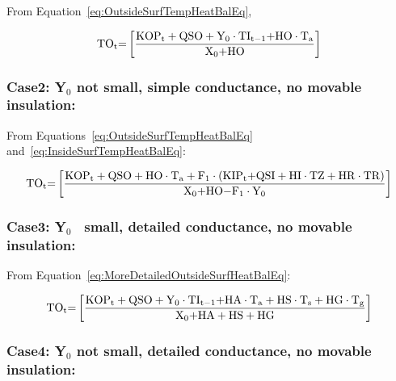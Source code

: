 From Equation~\ref{eq:OutsideSurfTempHeatBalEq},

\begin{equation}
{\rm{T}}{{\rm{O}}_{\rm{t}}}{\rm{ = }}\left[ {\frac{{{\rm{KO}}{{\rm{P}}_{\rm{t}}} + {\rm{QSO}} + {{\rm{Y}}_0}\cdot {\rm{T}}{{\rm{I}}_{{\rm{t - 1}}}}{\rm{ + HO}}\cdot {{\rm{T}}_{\rm{a}}}}}{{{{\rm{X}}_{\rm{0}}}{\rm{ + HO}}}}} \right]{\rm{  }}
\end{equation}

\subsubsection{Case2: Y\(_{0}\) not small, simple conductance, no movable insulation:}\label{case2-yux5f0-not-small-simple-conductance-no-movable-insulation}

From Equations~\ref{eq:OutsideSurfTempHeatBalEq} and~\ref{eq:InsideSurfTempHeatBalEq}:

\begin{equation}
{\rm{T}}{{\rm{O}}_{\rm{t}}}{\rm{ = }}\left[ {\frac{{{\rm{KO}}{{\rm{P}}_{\rm{t}}} + {\rm{QSO}} + {\rm{HO}}\cdot {{\rm{T}}_{\rm{a}}} + {{\rm{F}}_1}\cdot \left( {{\rm{KI}}{{\rm{P}}_{\rm{t}}}{\rm{ + QSI + HI}}\cdot {\rm{TZ + HR}}\cdot {\rm{TR}}} \right)}}{{{{\rm{X}}_{\rm{0}}}{\rm{ + HO - }}{{\rm{F}}_{\rm{1}}}\cdot {{\rm{Y}}_0}}}} \right]{\rm{  }}
\end{equation}

\subsubsection{Case3: Y\(_{0}\)~ small, detailed conductance, no movable insulation:}\label{case3-yux5f0-small-detailed-conductance-no-movable-insulation}

From Equation~\ref{eq:MoreDetailedOutsideSurfHeatBalEq}:

\begin{equation}
{\rm{T}}{{\rm{O}}_{\rm{t}}}{\rm{ = }}\left[ {\frac{{{\rm{KO}}{{\rm{P}}_{\rm{t}}} + {\rm{QSO}} + {{\rm{Y}}_0}\cdot {\rm{T}}{{\rm{I}}_{{\rm{t - 1}}}}{\rm{ + HA}}\cdot {{\rm{T}}_{\rm{a}}} + {\rm{HS}}\cdot {{\rm{T}}_{\rm{s}}} + {\rm{HG}}\cdot {{\rm{T}}_{\rm{g}}}}}{{{{\rm{X}}_{\rm{0}}}{\rm{ + HA + HS + HG}}}}} \right]{\rm{  }}
\end{equation}

\subsubsection{Case4: Y\(_{0}\) not small, detailed conductance, no movable insulation:}\label{case4-yux5f0-not-small-detailed-conductance-no-movable-insulation}

